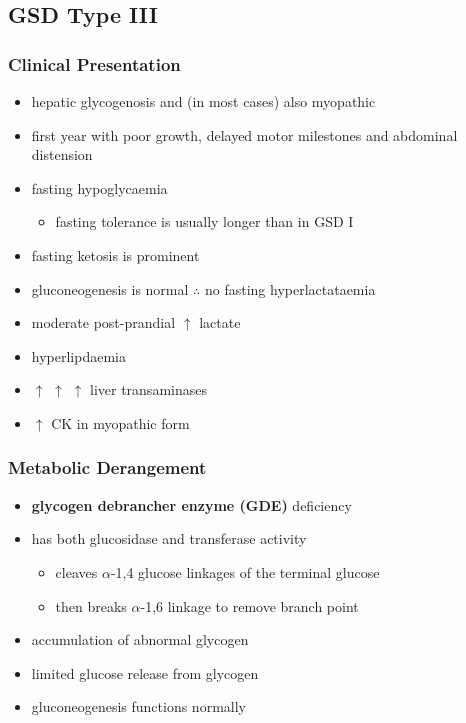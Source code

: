 \documentclass{scrartcl}
\begin{document}
\subsection{GSD Type III}
\label{sec:org7938f10}
\subsubsection{Clinical Presentation}
\label{sec:org57b5b88}
\begin{itemize}
\item hepatic glycogenosis and (in most cases) also myopathic
\item first year with poor growth, delayed motor milestones and abdominal
distension
\item fasting hypoglycaemia 
\begin{itemize}
\item fasting tolerance is usually longer than in GSD I
\end{itemize}
\item fasting ketosis is prominent
\item gluconeogenesis is normal \(\therefore\) no fasting hyperlactataemia
\item moderate post-prandial \(\uparrow\) lactate
\item hyperlipdaemia
\item \(\uparrow\) \(\uparrow\) \(\uparrow\) liver transaminases
\item \(\uparrow\) CK in myopathic form
\end{itemize}
\subsubsection{Metabolic Derangement}
\label{sec:org28f5361}
\begin{itemize}
\item \textbf{glycogen debrancher enzyme (GDE)} deficiency
\item has both glucosidase and transferase activity
\begin{itemize}
\item cleaves \(\alpha\)-1,4 glucose linkages of the terminal glucose
\item then breaks \(\alpha\)-1,6 linkage to remove branch point
\end{itemize}
\item accumulation of abnormal glycogen
\item limited glucose release from glycogen
\item gluconeogenesis functions normally
\end{itemize}
\end{document}
